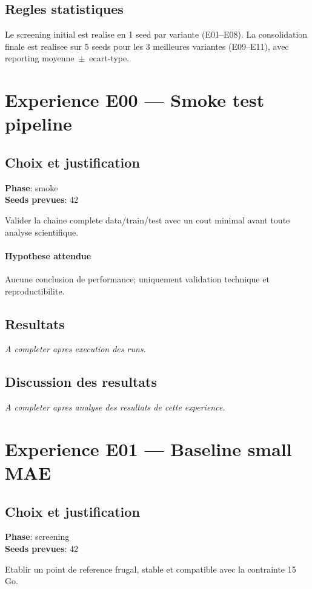\documentclass[11pt,a4paper]{article}
\begin{document}
\subsection{Regles statistiques}
Le screening initial est realise en 1 seed par variante (E01--E08). 
La consolidation finale est realisee sur 5 seeds pour les 3 meilleures variantes (E09--E11), avec reporting moyenne~$\pm$~ecart-type.


\section{Experience E00 --- Smoke test pipeline}
\subsection{Choix et justification}
\textbf{Phase}: smoke\\
\textbf{Seeds prevues}: 42

Valider la chaine complete data/train/test avec un cout minimal avant toute analyse scientifique.

\paragraph{Hypothese attendue}
Aucune conclusion de performance; uniquement validation technique et reproductibilite.

\subsection{Resultats}
\textit{A completer apres execution des runs.}

\subsection{Discussion des resultats}
\textit{A completer apres analyse des resultats de cette experience.}


\section{Experience E01 --- Baseline small MAE}
\subsection{Choix et justification}
\textbf{Phase}: screening\\
\textbf{Seeds prevues}: 42

Etablir un point de reference frugal, stable et compatible avec la contrainte 15 Go.
\end{document}

